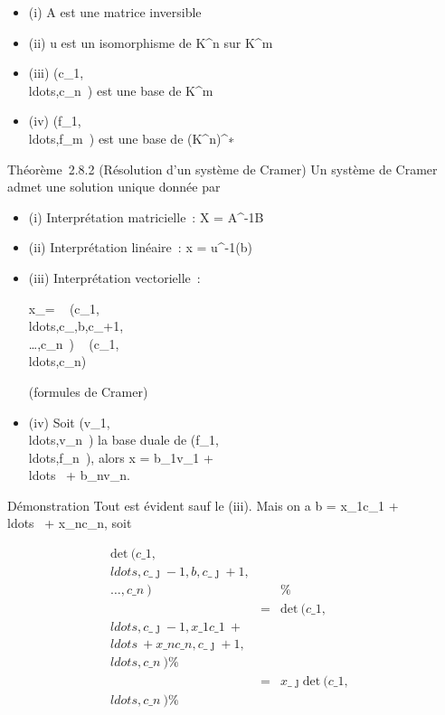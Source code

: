 \documentclass[]{article}
\begin{document}
\begin{itemize}
\itemsep1pt\parskip0pt
\item
  (i) A est une matrice inversible
\item
  (ii) u est un isomorphisme de K^n sur K^m
\item
  (iii)
  (c\_1,\\ldots,c\_n~)
  est une base de K^m
\item
  (iv)
  (f\_1,\\ldots,f\_m~)
  est une base de (K^n)^∗
\end{itemize}

Théorème~2.8.2 (Résolution d'un système de Cramer) Un système de Cramer
admet une solution unique donnée par

\begin{itemize}
\item
  (i) Interprétation matricielle~: X = A^-1B
\item
  (ii) Interprétation linéaire~: x = u^-1(b)
\item
  (iii) Interprétation vectorielle~:

  x\_\jmath =
  ~
  (c\_1,\\ldots,c\_,b,c\_\jmath+1,\\\ldots,c\_n~)
  \over
  ~
  (c\_1,\\ldots,c\_n)~

  (formules de Cramer)
\item
  (iv) Soit
  (v\_1,\\ldots,v\_n~)
  la base duale de
  (f\_1,\\ldots,f\_n~),
  alors x = b\_1v\_1 +
  \\ldots~ +
  b\_nv\_n.
\end{itemize}

Démonstration Tout est évident sauf le (iii). Mais on a b =
x\_1c\_1 +
\\ldots~ +
x\_nc\_n, soit

\begin{align*}
\mathrm{det}~
(c\_1,\\ldots,c\_\jmath-1,b,c\_\jmath+1,\\\ldots,c\_n~)&&
\%& \\ & =&
\mathrm{det}~
(c\_1,\\ldots,c\_\jmath-1,x\_1c\_1~
+ \\ldots~ +
x\_nc\_n,c\_\jmath+1,\\ldots,c\_n~)\%&
\\ & =&
x\_\jmath \mathrm{det}~
(c\_1,\\ldots,c\_n~)
\%& \\ \end{align*}
\end{document}
